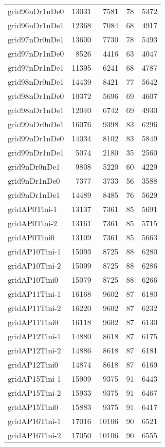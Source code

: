 \begin{longtable}{lrrrr}
grid96nDr1nDe0 & 13031 & 7581 & 78 & 5372 \\
grid96nDr1nDe1 & 12368 & 7084 & 68 & 4917 \\
grid97nDr0nDe1 & 13600 & 7730 & 78 & 5493 \\
grid97nDr1nDe0 & 8526 & 4416 & 63 & 4047 \\
grid97nDr1nDe1 & 11395 & 6241 & 68 & 4787 \\
grid98nDr0nDe1 & 14439 & 8421 & 77 & 5642 \\
grid98nDr1nDe0 & 10372 & 5696 & 69 & 4607 \\
grid98nDr1nDe1 & 12040 & 6742 & 69 & 4930 \\
grid99nDr0nDe1 & 16076 & 9398 & 83 & 6296 \\
grid99nDr1nDe0 & 14034 & 8102 & 83 & 5849 \\
grid99nDr1nDe1 & 5074 & 2180 & 35 & 2560 \\
grid9nDr0nDe1 & 9808 & 5220 & 60 & 4229 \\
grid9nDr1nDe0 & 7377 & 3733 & 56 & 3588 \\
grid9nDr1nDe1 & 14489 & 8485 & 76 & 5629 \\
gridAP0Tini-1 & 13137 & 7361 & 85 & 5691 \\
gridAP0Tini-2 & 13161 & 7361 & 85 & 5715 \\
gridAP0Tini0 & 13109 & 7361 & 85 & 5663 \\
gridAP10Tini-1 & 15093 & 8725 & 88 & 6280 \\
gridAP10Tini-2 & 15099 & 8725 & 88 & 6286 \\
gridAP10Tini0 & 15079 & 8725 & 88 & 6266 \\
gridAP11Tini-1 & 16168 & 9602 & 87 & 6180 \\
gridAP11Tini-2 & 16220 & 9602 & 87 & 6232 \\
gridAP11Tini0 & 16118 & 9602 & 87 & 6130 \\
gridAP12Tini-1 & 14880 & 8618 & 87 & 6175 \\
gridAP12Tini-2 & 14886 & 8618 & 87 & 6181 \\
gridAP12Tini0 & 14874 & 8618 & 87 & 6169 \\
gridAP15Tini-1 & 15909 & 9375 & 91 & 6443 \\
gridAP15Tini-2 & 15933 & 9375 & 91 & 6467 \\
gridAP15Tini0 & 15883 & 9375 & 91 & 6417 \\
gridAP16Tini-1 & 17016 & 10106 & 90 & 6521 \\
gridAP16Tini-2 & 17050 & 10106 & 90 & 6555 \\

\end{longtable}
